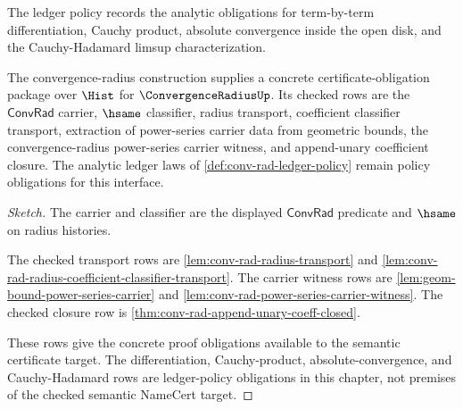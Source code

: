 \begin{definition}
\label{def:conv-rad-ledger-policy}
The ledger policy records the analytic obligations for term-by-term
differentiation, Cauchy product, absolute convergence inside the open disk, and
the Cauchy-Hadamard limsup characterization.
\end{definition}

\begin{theorem}
\label{thm:conv-rad-namecert}
The convergence-radius construction supplies a concrete certificate-obligation
package over $\Hist$ for $\ConvergenceRadiusUp$. Its checked rows are the
$\mathsf{ConvRad}$ carrier, $\hsame$ classifier, radius transport, coefficient
classifier transport, extraction of power-series carrier data from geometric
bounds, the convergence-radius power-series carrier witness, and append-unary
coefficient closure. The analytic ledger laws of
\autoref{def:conv-rad-ledger-policy} remain policy obligations for this
interface.
\end{theorem}
\begin{proof}[Sketch]
The carrier and classifier are the displayed $\mathsf{ConvRad}$ predicate and
$\hsame$ on radius histories.

The checked transport rows are
\autoref{lem:conv-rad-radius-transport} and
\autoref{lem:conv-rad-radius-coefficient-classifier-transport}. The carrier
witness rows are \autoref{lem:geom-bound-power-series-carrier} and
\autoref{lem:conv-rad-power-series-carrier-witness}. The checked closure row is
\autoref{thm:conv-rad-append-unary-coeff-closed}.

These rows give the concrete proof obligations available to the semantic
certificate target. The differentiation, Cauchy-product, absolute-convergence,
and Cauchy-Hadamard rows are ledger-policy obligations in this chapter, not
premises of the checked semantic NameCert target.
\end{proof}

